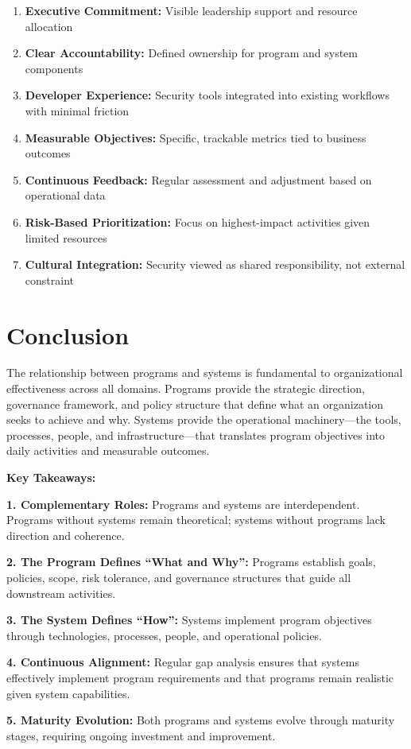 \documentclass[11pt,letterpaper]{article}
\begin{document}
\begin{examplebox}
\begin{enumerate}[leftmargin=1.5em, itemsep=0.3em]
    \item \textbf{Executive Commitment:} Visible leadership support and resource allocation
    \item \textbf{Clear Accountability:} Defined ownership for program and system components
    \item \textbf{Developer Experience:} Security tools integrated into existing workflows with minimal friction
    \item \textbf{Measurable Objectives:} Specific, trackable metrics tied to business outcomes
    \item \textbf{Continuous Feedback:} Regular assessment and adjustment based on operational data
    \item \textbf{Risk-Based Prioritization:} Focus on highest-impact activities given limited resources
    \item \textbf{Cultural Integration:} Security viewed as shared responsibility, not external constraint
\end{enumerate}
\end{examplebox}

\section{Conclusion}

The relationship between programs and systems is fundamental to organizational effectiveness across all domains. Programs provide the strategic direction, governance framework, and policy structure that define what an organization seeks to achieve and why. Systems provide the operational machinery---the tools, processes, people, and infrastructure---that translates program objectives into daily activities and measurable outcomes.

\begin{summarybox}
\textbf{Key Takeaways:}

\textbf{1. Complementary Roles:} Programs and systems are interdependent. Programs without systems remain theoretical; systems without programs lack direction and coherence.

\textbf{2. The Program Defines ``What and Why'':} Programs establish goals, policies, scope, risk tolerance, and governance structures that guide all downstream activities.

\textbf{3. The System Defines ``How'':} Systems implement program objectives through technologies, processes, people, and operational policies.

\textbf{4. Continuous Alignment:} Regular gap analysis ensures that systems effectively implement program requirements and that programs remain realistic given system capabilities.

\textbf{5. Maturity Evolution:} Both programs and systems evolve through maturity stages, requiring ongoing investment and improvement.
\end{summarybox}
\end{document}

